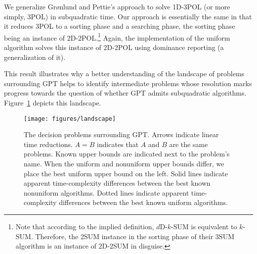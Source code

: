 We generalize Gr\o nlund and Pettie's approach to solve 1D-3POL (or
more simply, 3POL) in subquadratic time. Our approach is essentially the same
in that it reduces 3POL to a sorting phase and a searching phase, the sorting
phase being an instance of 2D-2POL.\footnote{Note that according to the implied
definition, \(d\)D-\(k\)-SUM is equivalent to \(k\)-SUM. Therefore, the 2SUM
instance in the sorting phase of their 3SUM algorithm is an instance of 2D-2SUM
in disguise.} Again, the implementation of the uniform algorithm solves this
instance of 2D-2POL using dominance reporting (a generalization of it).

This result illustrates why a better understanding of the landscape of problems
surrounding GPT helps to identify intermediate problems whose resolution marks
progress towards the question of whether GPT admits subquadratic algorithms.
%
Figure~\ref{fig:landscape} depicts this landscape.

\begin{figure}
  \centering{}
  \texttt{[image: figures/landscape]}
  \caption{%
	The decision problems surrounding GPT.
	Arrows indicate linear time reductions.
	\(A = B\) indicates that \(A\) and \(B\) are the same problems.
	Known upper bounds are indicated next to the problem's name.
	When the uniform and nonuniform upper bounds differ, we place the best
	uniform upper bound on the left.
	Solid lines indicate apparent time-complexity differences between the best
	known nonuniform algorithms.
	Dotted lines indicate apparent
	time-complexity differences between the best known uniform algorithms.%
  }%
  \label{fig:landscape}
\end{figure}
